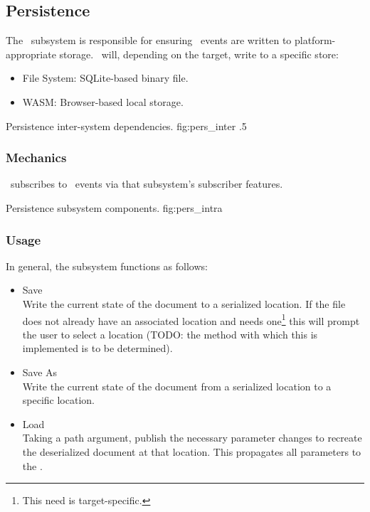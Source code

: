 \subsection{Persistence}
The \permod\ subsystem is responsible for ensuring \docdtype\ events are written to platform-appropriate storage.
\permod\ will, depending on the target, write to a specific store:
\begin{itemize}
      \item File System: SQLite-based binary file.
      \item WASM: Browser-based local storage.
\end{itemize}

{Persistence inter-system dependencies.}
{fig:pers_inter}
{.5}


\subsubsection{Mechanics}
\perftype\ subscribes to \docmod\ events via that subsystem's \docftype subscriber features.


{Persistence subsystem components.}
{fig:pers_intra}
{}


\subsubsection{Usage}
In general, the subsystem functions as follows:
\begin{itemize}
      \item Save \\
            Write the current state of the document to a serialized location.
            If the file does not already have an associated location and needs one\footnote{This need is target-specific.} this will prompt the user to select a location (TODO: the method with which this is implemented is to be determined).
      \item Save As \\
            Write the current state of the document from a serialized location to a specific location.
      \item Load \\
            Taking a path argument, publish the necessary parameter changes to recreate the deserialized document at that location.
            This propagates all parameters to the \docftype.
\end{itemize}